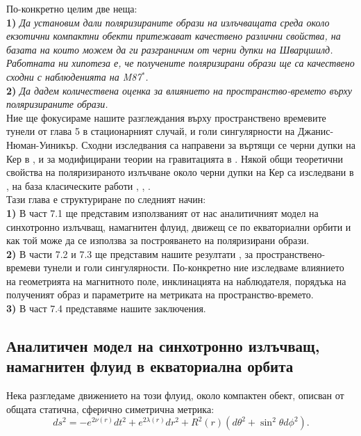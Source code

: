 По-конкретно целим две неща: \\

\textbf{1)} \emph{Да установим дали поляризираните образи на излъчващата среда около екзотични компактни обекти притежават качествено различни свойства, на базата на които можем да ги разграничим от черни дупки на Шварцшилд. Работната ни хипотеза е, че получените поляризирани образи ще са качествено сходни с наблюденията на M87$^*$.}\\

\textbf{2)} \emph{Да дадем количествена оценка за влиянието на пространство-времето върху поляризираните образи.}\\

Ние ще фокусираме нашите разглеждания върху пространствено времевите тунели от глава 5 в стационарният случай, и голи сингулярности на Джанис-Нюман-Уиникър. Сходни изследвания са направени за въртящи се черни дупки на Кер в \cite{Gelles2021}, и за модифицирани теории на гравитацията в \cite{Qin2021}. Някой общи теоретични свойства на поляризираното излъчване около черни дупки на Кер са изследвани в \cite{Himwich2020}, на база класическите работи \cite{Luminet1979}, \cite{Connors1980}, \cite{Chen1991}.\\

Тази глава е структуриране по следният начин: \\

\textbf{1)} В част 7.1 ще представим използваният от нас аналитичният модел на синхотронно излъчващ, намагнитен флуид, движещ се по екваториални орбити и как той може да се използва за построяването на поляризирани образи.\\

\textbf{2)} В части 7.2 и 7.3 ще представим нашите резултати \cite{Delijski2022}, \cite{Deliyski2022} за пространствено-времеви тунели и голи сингулярности. По-конкретно ние изследваме влиянието на геометрията на магнитното поле, инклинацията на наблюдателя, порядъка на полученият образ и параметрите на метриката на пространство-времето.\\

\textbf{3)} В част 7.4 представяме нашите заключения. 

\subsection{Аналитичен модел на синхотронно излъчващ, намагнитен флуид в екваториална орбита}

Нека разгледаме движението на този флуид, около компактен обект, описван от общата статична, сферично симетрична метрика:
\begin{equation}
	ds^2 = - e^{2\nu(r)}dt^2 + e^{2\lambda(r)}dr^2 + R^2(r)\left(d\theta^2 + \sin^2\theta d\phi^2\right).
\end{equation}

